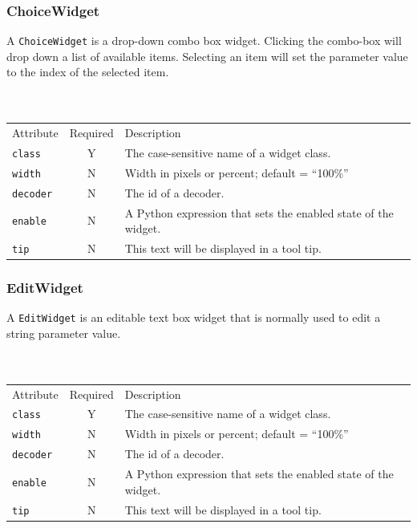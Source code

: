 \documentclass[a4paper,twoside,12pt]{article}
\newcommand{\code}[1]{\color{red}\texttt{#1}\color{black}}
\begin{document}
\subsubsection{ChoiceWidget}
A \code{ChoiceWidget}{} is a drop-down combo box widget. Clicking
the combo-box will drop down a list of available items. Selecting
an item will set the parameter value to the index of the selected
item.
\\
\\
\\
\begin{tabular}{|l|c|p{9cm}|}
\hline
Attribute & Required & Description \\
\code{class} & Y & The case-sensitive name of a widget class. \\
\code{width} & N & Width in pixels or percent; default = ``100\%'' \\
\code{decoder} & N & The id of a decoder. \\
\code{enable} & N & A Python expression that sets the
enabled state of the widget. \\
\code{tip} & N & This text will be displayed in a tool tip. \\
\hline
\end{tabular}

\subsubsection{EditWidget}
A \code{EditWidget}{} is an editable text box widget that is
normally used to edit a string parameter value.
\\
\\
\\
\begin{tabular}{|l|c|p{9cm}|}
\hline
Attribute & Required & Description \\
\code{class} & Y & The case-sensitive name of a widget class. \\
\code{width} & N & Width in pixels or percent; default = ``100\%'' \\
\code{decoder} & N & The id of a decoder. \\
\code{enable} & N & A Python expression that sets the
enabled state of the widget. \\
\code{tip} & N & This text will be displayed in a tool tip. \\
\hline
\end{tabular}
\end{document}
